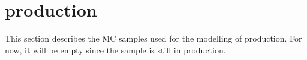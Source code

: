 \section[tgamma production]{\tgamma production}
\label{subsec:tgamma}

This section describes the MC samples used for the modelling of \tgamma production.
For now, it will be empty since the sample is still in production.
